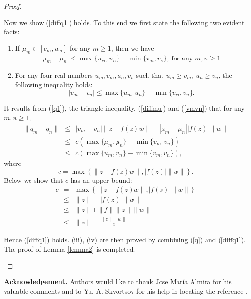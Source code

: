 \documentclass[12pt, reqno]{amsart}
\theoremstyle{definition}
\theoremstyle{remark}
\numberwithin{equation}{section}
\begin{document}
\begin{proof}
\begin{description}
Now we show (\ref{diffq1}) holds.  To this end we first state the following two evident facts:
\begin{enumerate}
\item If $\mu_m\in[v_m,u_m]$ for any $m\ge1$, then we have
\begin{equation}
\label{diffmu}
|\mu_m-\mu_n|\le \max\{u_m,u_n\}-\min\{v_m,v_n\},~\mbox{for any $m,n\ge1$}.
\end{equation}
\item For any four real numbers $u_m,v_m,u_n,v_n$ such that $u_m\ge v_m,~u_n\ge v_n$, the following inequality holds:
\begin{equation}
\label{vmvn}
|v_m-v_n|\le \max\{u_m,u_n\}-\min\{v_m,v_n\}.
\end{equation}
\end{enumerate}
It results from (\ref{q1}), the triangle inequality, (\ref{diffmu}) and (\ref{vmvn}) that for any $m,n\ge1$,
\begin{eqnarray*}
\label{dq}
\|q_m-q_n\|&\le& |v_m-v_n|\|z-f(z)w\|+|\mu_m-\mu_n||f(z)|\|w\|\nonumber\\
&\le& c\left(\max\{\mu_m,\mu_n\}-\min\{v_m,v_n\}\right)\nonumber\\
&\le& c\left(\max\{u_m,u_n\}-\min\{v_m,v_n\}\right),
\end{eqnarray*}
where
$$
c=\max\left\{\|z-f(z)w\|,|f(z)|\|w\|\right\}.
$$
Below we show that  $c$ has an upper bound: 
\begin{eqnarray*}
c&=& \max\left\{\|z-f(z)w\|,|f(z)|\|w\|\right\}\\
&\le& \|z\|+|f(z)|\|w\|\\
&\le& \|z\|+\|f\|\|z\|\|w\|\\
&\le& \|z\|+\frac{\|z\|\|w\|}{2}.
\end{eqnarray*}

Hence (\ref{diffq1}) holds. (iii), (iv) are then proved by combining (\ref{q}) and (\ref{diffq1}). The proof of Lemma \ref{lemma2} is completed.
\end{description}
\end{proof}
\fi

\noindent \textbf{Acknowledgement.} Authors would like to thank Jose Mar\'ia Almira for his valuable comments and to Yu. A. Skvortsov for his help in locating the reference \cite{Nik}.
\end{document}
